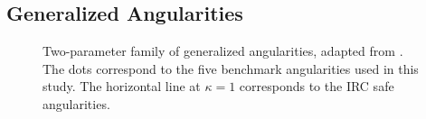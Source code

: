 \documentclass[11pt]{cernrep}
\begin{document}
\subsection{Generalized Angularities}
\label{quarkgluon_sec:genang}

\begin{figure}
\centering
{}
\caption{Two-parameter family of generalized angularities, adapted from \cite{Larkoski:2014pca}.  The dots correspond to the five benchmark angularities used in this study.  The horizontal line at $\kappa = 1$ corresponds to the IRC safe angularities.}
\label{quarkgluon_fig:lambda_space}
\end{figure}
\end{document}
